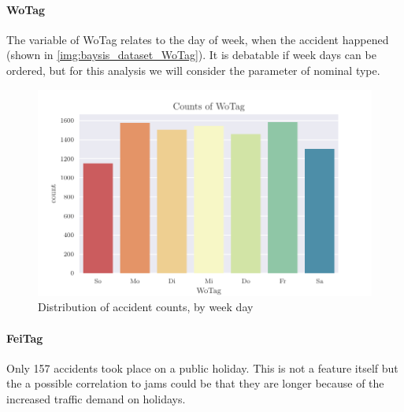 \paragraph{WoTag}
\label{baysis_dataset_WoTag}
The variable of WoTag relates to the day of week, when the accident happened (shown in \autoref{img:baysis_dataset_WoTag}). It is debatable if week days can be ordered, but for this analysis we will consider the parameter of nominal type.
\begin{figure}[ht]
	\centering
	\includegraphics[scale=0.75]{CorrAnalysis/data/BAYSIS/01_dataset/plots/baysis_dataset_count_WoTag}
	\caption{Distribution of accident counts, by week day}
	\label{img:baysis_dataset_WoTag}
	\vspace{-8mm}
\end{figure}

\paragraph{FeiTag}
\label{baysis_dataset_FeiTag}
Only 157 accidents took place on a public holiday. This is not a feature itself but the a possible correlation to jams could be that they are longer because of the increased traffic demand on holidays.
	

